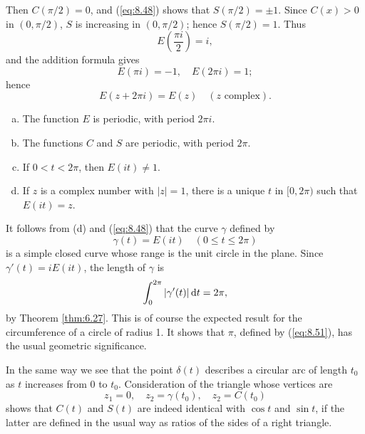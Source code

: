 Then $C(\pi/2) = 0$, and (\ref{eq:8.48}) shows that $S(\pi/2) = \pm 1$.
Since $C(x) > 0$ in $(0, \pi/2)$,
$S$ is increasing in $(0, \pi/2)$;
hence $S(\pi/2) = 1$. Thus 
\begin{equation*}
    E\left( \frac{\pi i}{2} \right) = i,
\end{equation*}
and the addition formula gives
\begin{equation}
    \label{eq:8.52}
    E(\pi i) = -1, \quad
    E(2 \pi i) = 1;
\end{equation}
hence 
\begin{equation}
    \label{eq:8.53}
    E(z + 2\pi i) = E(z)
    \quad (z \text{ complex}).
\end{equation}

\begin{thm}
    \label{thm:8.7}
    \begin{enumerate}[(a)]
        \item The function $E$ is periodic, with period $2 \pi i$.
        \item The functions $C$ and $S$ are periodic, with period $2 \pi$.
        \item If $0 < t < 2 \pi$, then $E(it) \neq 1$.
        \item If $z$ is a complex number with $\left| z \right| = 1$, there is a unique $t$ in $[0, 2\pi)$ such that $E(it) = z$.
    \end{enumerate}
\end{thm}



It follows from (d) and (\ref{eq:8.48}) that the curve $\gamma$ defined by
\begin{equation}
    \label{eq:8.54}
    \gamma (t) = E(it)
    \quad (0 \leq t \leq 2\pi)
\end{equation}
is a simple closed curve whose range is the unit circle in the plane.
Since $\gamma'(t) = i E(it)$, the length of $\gamma$ is 
\begin{equation*}
    \int_{0}^{2\pi} \left| \gamma'(t) \right| \d t = 2\pi,
\end{equation*}
by Theorem \ref{thm:6.27}.
This is of course the expected result for the circumference of
a circle of radius 1. 
It shows that $\pi$, defined by (\ref{eq:8.51}), has the usual geometric
significance.

In the same way we see that the point $\delta(t)$ describes a circular arc of length
$t_0$ as $t$ increases from 0 to $t_0$.
Consideration of the triangle whose vertices are
\begin{equation*}
    z_1 = 0, \quad
    z_2 = \gamma (t_0), \quad
    z_2 = C(t_0)
\end{equation*}
shows that $C(t)$ and $S(t)$ are indeed identical with $\cos t$ and $\sin t$, if the latter are defined in the usual way as ratios of the sides of a right triangle.

